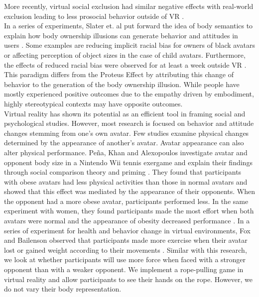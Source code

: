 More recently, virtual social exclusion had similar negative effects with real-world exclusion leading to less prosocial behavior outside of VR \cite{kothgassner2017real}.\\
In a series of experiments, Slater et. al put forward the idea of body semantics to explain how body ownership illusions can generate behavior and attitudes in users \cite{slater2014transcending}. Some examples are reducing implicit racial bias for owners of black avatars or affecting perception of object sizes in the case of child avatars. Furthermore, the effects of reduced racial bias were observed for at least a week outside VR \cite{banakou2016virtual}. 
This paradigm differs from the Proteus Effect by attributing this change of behavior to the generation of the body ownership illusion. While people have mostly experienced positive outcomes due to the empathy driven by embodiment, highly stereotypical contexts may have opposite outcomes.\\
Virtual reality has shown its potential as an efficient tool in framing social and psychological studies. 
However, most research is focused on behavior and attitude changes stemming from one's own avatar. Few studies examine physical changes determined by the appearance of another's avatar. Avatar appearance can also alter physical performance. Peña, Khan and Alexopoulos investigate avatar and opponent body size in a Nintendo Wii tennis exergame and explain their findings through social comparison theory and priming \cite{pena2016see}. They found that participants with obese avatars had less physical activities than those in normal avatars and showed that this effect was mediated by the appearance of their opponents. When the opponent had a more obese avatar, participants performed less. In the same experiment with women, they found participants made the most effort when both avatars were normal and the appearance of obesity decreased performance \cite{pena2014increasing}. In a series of experiment for health and behavior change in virtual environments, Fox and Bailenson observed that participants made more exercise when their avatar lost or gained weight according to their movements \cite{fox2009virtual}. Similar with this research, we look at whether participants will use more force when faced with a stronger opponent than with a weaker opponent. We implement a rope-pulling game in virtual reality and allow participants to see their hands on the rope. However, we do not vary their body representation.
 
